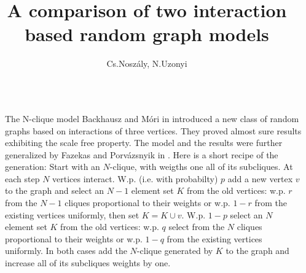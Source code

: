 \documentclass[final]{beamer}
\title{A comparison of two interaction based random graph models} %
\author{Cs.Noszály, N.Uzonyi} %
\institute{Faculty of Informatics, University of Debrecen} %
\newlength{\sepwid}
\newlength{\onecolwid}
\newlength{\twocolwid}
\begin{document}

\setlength{\belowcaptionskip}{2ex} %
\setlength\belowdisplayshortskip{2ex} %

\begin{frame}[t] %

\begin{columns}[t] %

\begin{column}{\sepwid}\end{column} %

\begin{column}{\twocolwid} %

\begin{columns}[t,totalwidth=\twocolwid] %

\begin{column}{\onecolwid}\vspace{-.6in} %

\begin{block}{The N-clique model}\small
Backhausz and Móri in \cite{BaMo} introduced a new class of random graphs 
based on interactions of three vertices. They proved almost sure results 
exhibiting the scale free property. The model and the results were further 
generalized by Fazekas and Porvázsnyik in \cite{FaPo}. Here is a short recipe 
of the generation: Start with an $N$-clique, with weigths one all of its 
subcliques. At each step $N$ vertices interact. W.p. (i.e. with probabilty) 
$p$ add a new vertex $v$ to the graph and select an $N-1$ element set $K$ 
from the old vertices: w.p. $r$ from the $N-1$ cliques proportional to their
 weights or w.p. $1-r$ from the existing vertices uniformly, then set $K=K\cup{v}$. 
 W.p. $1-p$ select an $N$ element set $K$ from the old vertices: w.p. $q$ select 
 from the $N$ cliques proportional to their weights or w.p. $1-q$ from the existing 
 vertices uniformly. In both cases add the $N$-clique generated by $K$ to the graph 
 and increase all of its subcliques weights by one.


\end{block}
\end{column}
\end{columns}
\end{column}
\end{columns}
\end{frame}
\end{document}
